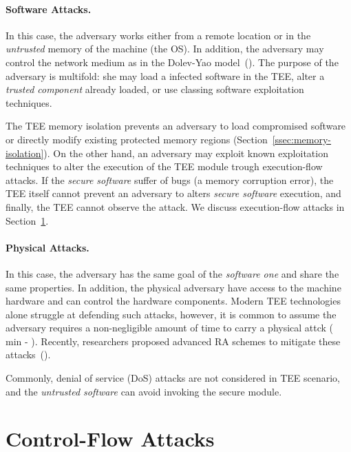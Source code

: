 \paragraph{Software Attacks.} 
In this case, the adversary works either from a remote location or in the 
\emph{untrusted} memory of the machine (\eg the OS).
In addition, the adversary may control the network medium as in the Dolev-Yao 
model~(\cite{dolev}).
The purpose of the adversary is multifold: she may load a infected software in 
the TEE, alter a \emph{trusted component} already loaded, or use classing 
software exploitation techniques.

The TEE memory isolation prevents an adversary to load compromised software or 
directly modify existing protected memory regions 
(Section~\ref{ssec:memory-isolation}).
On the other hand, an adversary may exploit known exploitation techniques to 
alter the execution of the TEE module trough execution-flow attacks.
If the \emph{secure software} suffer of bugs (\eg a memory corruption error), 
the TEE itself cannot prevent an adversary to alters \emph{secure software} 
execution, and finally, the TEE cannot observe the attack.
We discuss execution-flow attacks in Section~\ref{sec:control-flow-attacks}.

\paragraph{Physical Attacks.}
In this case, the adversary has the same goal of the \emph{software 
one} and share the same properties. In addition, the physical adversary have 
access to the machine hardware and can control the hardware components.
Modern TEE technologies alone struggle at defending such attacks, however, it 
is common to assume the adversary requires a non-negligible amount of time to 
carry a physical attck ( min - 
\cite{conti2010smallville,conti2008emergent,darpa,ibrahim2017seed,pasta,us-aid}).
Recently, researchers proposed advanced RA schemes to mitigate these 
attacks~(\cite{darpa,visintin2019safe,pasta}).

Commonly, denial of service (DoS) attacks are not considered in TEE scenario, 
and the \emph{untrusted software} can avoid invoking the secure module.

\section{Control-Flow Attacks}
\label{sec:control-flow-attacks}

